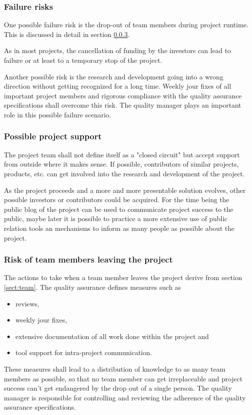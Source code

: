 \documentclass[a4paper,11pt]{article}
\begin{document}
\subsubsection{Failure risks}
One possible failure risk is the drop-out of team members during project runtime. This is discussed in detail in section \ref{p:members_leave_project}.

As in most projects, the cancellation of funding by the investors can lead to failure or at least to a temporary stop of the project.

Another possible risk is the research and development going into a wrong direction without getting recognized for a long time. Weekly jour fixes of all important project members and rigorous compliance with the quality assurance specifications shall overcome this risk. The quality manager plays an important role in this possible failure scenario.

\subsubsection{Possible project support}
The project team shall not define itself as a "closed circuit" but accept support from outside where it makes sense. If possible, contributors of similar projects, products, etc. can get involved into the research and development of the project.

As the project proceeds and a more and more presentable solution evolves, other possible investors or contributors could be acquired. For the time being the public blog of the project can be used to communicate project success to the public, maybe later it is possible to practice a more extensive use of public relation tools an mechanisms to inform as many people as possible about the project.

\subsubsection{Risk of team members leaving the project}
\label{p:members_leave_project}
The actions to take when a team member leaves the project derive from section \ref{sect:team}. The quality assurance defines measures such as
\begin{itemize}
\item reviews,
\item weekly jour fixes,
\item extensive documentation of all work done within the project and
\item tool support for intra-project communication.
\end{itemize}
These measures shall lead to a distribution of knowledge to as many team members as possible, so that no team member can get irreplaceable and project success can't get endangered by the drop out of a single person. The quality manager is responsible for controlling and reviewing the adherence of the quality assurance specifications.
\end{document}
